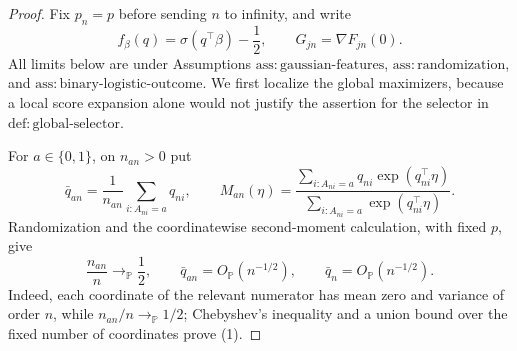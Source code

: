 \documentclass{article}
\begin{document}
\begin{proof}
Fix \(p_n=p\) before sending \(n\) to infinity, and write
\[
 f_\beta(q)=\sigma(q^\top\beta)-\frac12,
 \qquad
 G_{jn}=\nabla F_{jn}(0).
\]
All limits below are under Assumptions
\(\mathrm{ass{:}gaussian\mbox{-}features}\),
\(\mathrm{ass{:}randomization}\), and
\(\mathrm{ass{:}binary\mbox{-}logistic\mbox{-}outcome}\).  We first
localize the global maximizers, because a local score expansion alone would
not justify the assertion for the selector in
\(\mathrm{def{:}global\mbox{-}selector}\).

For \(a\in\{0,1\}\), on \(n_{an}>0\) put
\[
 \bar q_{an}=\frac1{n_{an}}\sum_{i:A_{ni}=a}q_{ni},
 \qquad
 M_{an}(\eta)=
 \frac{\sum_{i:A_{ni}=a}q_{ni}\exp(q_{ni}^{\top}\eta)}
      {\sum_{i:A_{ni}=a}\exp(q_{ni}^{\top}\eta)} .
\]
Randomization and the coordinatewise second-moment calculation, with fixed
\(p\), give
\[
 \frac{n_{an}}n\longrightarrow_{\mathbb P}\frac12,
 \qquad
 \bar q_{an}=O_{\mathbb P}(n^{-1/2}),
 \qquad
 \bar q_n=O_{\mathbb P}(n^{-1/2}).
 \tag{1}
\]
Indeed, each coordinate of the relevant numerator has mean zero and variance
of order \(n\), while \(n_{an}/n\to_{\mathbb P}1/2\); Chebyshev's inequality
and a union bound over the fixed number of coordinates prove (1).


\end{proof}
\end{document}
